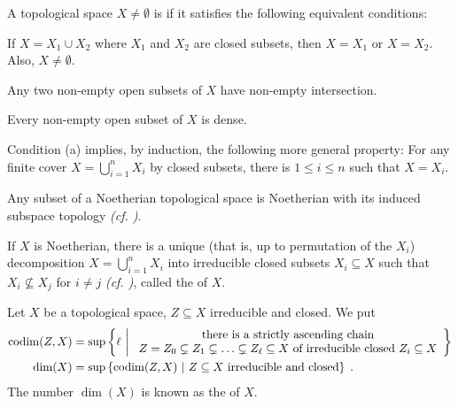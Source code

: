 \documentclass[a4paper,parskip=half,numbers=enddot, DIV=12, headheight=30pt]{scrreprt}
\begin{document}
\begin{defi}
	A topological space $X\not=\emptyset$ is  if it satisfies the following equivalent conditions:
	\begin{alphanumerate}
		\item If $X = X_1\cup X_2$ where $X_1$ and $X_2$ are closed subsets, then $X=X_1$ or $X=X_2$. Also, $X\neq\emptyset$.
		\item Any two non-empty open subsets of $X$ have non-empty intersection.
		\item Every non-empty open subset of $X$ is dense.
	\end{alphanumerate}
\end{defi}
Condition (a) implies, by induction, the following more general property: 
For any finite cover $X= \bigcup_{i=1}^n X_i$ by closed subsets, there is $1\leq i\leq n$ such that $X=X_i$.
\begin{prop}
	\begin{alphanumerate}
		\item 
		Any subset of a Noetherian topological space is Noetherian with its induced subspace topology \emph{(cf. \cite[Remark~2.2.1]{alg1})}. 
		\item 
		If $X$ is Noetherian, there is a unique (that is, up to permutation of the $X_i$) decomposition $X = \bigcup_{i=1}^n X_i$ into irreducible closed subsets $X_i\subseteq X$ such that $X_i\not\subseteq X_j$ for $i\neq j$ \emph{(cf. \cite[Proposition~2.1.1]{alg1})}, called the  of $X$.
	\end{alphanumerate}
	
\end{prop}
\begin{defi}
	Let $X$ be a topological space, $Z\subseteq X$ irreducible and closed. We put 
	\begin{align*}
	\operatorname{codim}(Z,X) &= \sup\left\{\ell\ \middle|\  
	\begin{array}{c}
	\text{there is a strictly ascending chain}\\
	Z=Z_0 \subsetneq Z_1\subsetneq \ldots \subsetneq Z_\ell\subseteq X\text{ of irreducible closed }Z_i\subseteq X
	\end{array}\right\}\\
	\dim(X) &= \sup\left\{\operatorname{codim}(Z,X)\ \middle|\  Z\subseteq X \text{ irreducible and closed}\right\}\;.
	\end{align*}
	The number $\dim(X)$ is known as the  of $X$.
\end{defi}
\end{document}
